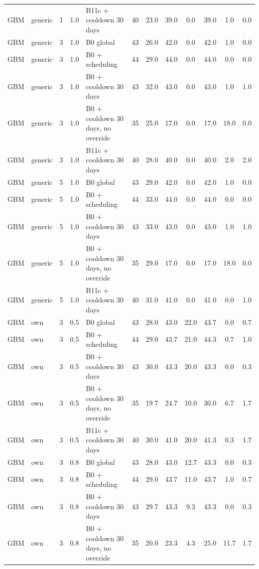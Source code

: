 \begin{longtable}{lllllccccccc}
GBM & generic & 1 & 1.0 & B11c + cooldown 30 days & 40 & 23.0 & 39.0 & 0.0 & 39.0 & 1.0 & 0.0 \\
GBM & generic & 3 & 1.0 & B0 global & 43 & 26.0 & 42.0 & 0.0 & 42.0 & 1.0 & 0.0 \\
GBM & generic & 3 & 1.0 & B0 + scheduling & 44 & 29.0 & 44.0 & 0.0 & 44.0 & 0.0 & 0.0 \\
GBM & generic & 3 & 1.0 & B0 + cooldown 30 days & 43 & 32.0 & 43.0 & 0.0 & 43.0 & 1.0 & 1.0 \\
GBM & generic & 3 & 1.0 & B0 + cooldown 30 days, no override & 35 & 25.0 & 17.0 & 0.0 & 17.0 & 18.0 & 0.0 \\
GBM & generic & 3 & 1.0 & B11c + cooldown 30 days & 40 & 28.0 & 40.0 & 0.0 & 40.0 & 2.0 & 2.0 \\
GBM & generic & 5 & 1.0 & B0 global & 43 & 29.0 & 42.0 & 0.0 & 42.0 & 1.0 & 0.0 \\
GBM & generic & 5 & 1.0 & B0 + scheduling & 44 & 33.0 & 44.0 & 0.0 & 44.0 & 0.0 & 0.0 \\
GBM & generic & 5 & 1.0 & B0 + cooldown 30 days & 43 & 33.0 & 43.0 & 0.0 & 43.0 & 1.0 & 1.0 \\
GBM & generic & 5 & 1.0 & B0 + cooldown 30 days, no override & 35 & 29.0 & 17.0 & 0.0 & 17.0 & 18.0 & 0.0 \\
GBM & generic & 5 & 1.0 & B11c + cooldown 30 days & 40 & 31.0 & 41.0 & 0.0 & 41.0 & 0.0 & 1.0 \\
GBM & own & 3 & 0.5 & B0 global & 43 & 28.0 & 43.0 & 22.0 & 43.7 & 0.0 & 0.7 \\
GBM & own & 3 & 0.5 & B0 + scheduling & 44 & 29.0 & 43.7 & 21.0 & 44.3 & 0.7 & 1.0 \\
GBM & own & 3 & 0.5 & B0 + cooldown 30 days & 43 & 30.0 & 43.3 & 20.0 & 43.3 & 0.0 & 0.3 \\
GBM & own & 3 & 0.5 & B0 + cooldown 30 days, no override & 35 & 19.7 & 24.7 & 10.0 & 30.0 & 6.7 & 1.7 \\
GBM & own & 3 & 0.5 & B11c + cooldown 30 days & 40 & 30.0 & 41.0 & 20.0 & 41.3 & 0.3 & 1.7 \\
GBM & own & 3 & 0.8 & B0 global & 43 & 28.0 & 43.0 & 12.7 & 43.3 & 0.0 & 0.3 \\
GBM & own & 3 & 0.8 & B0 + scheduling & 44 & 29.0 & 43.7 & 11.0 & 43.7 & 1.0 & 0.7 \\
GBM & own & 3 & 0.8 & B0 + cooldown 30 days & 43 & 29.7 & 43.3 & 9.3 & 43.3 & 0.0 & 0.3 \\
GBM & own & 3 & 0.8 & B0 + cooldown 30 days, no override & 35 & 20.0 & 23.3 & 4.3 & 25.0 & 11.7 & 1.7 \\

\end{longtable}
